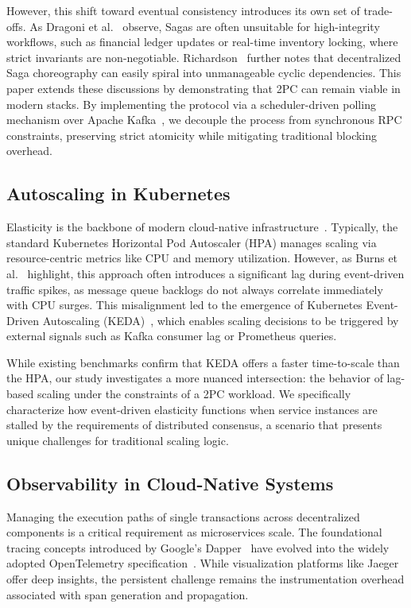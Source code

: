 However, this shift toward eventual consistency introduces its own set of trade-offs. As Dragoni et al.~\cite{dragoni2017microservices} observe, Sagas are often unsuitable for high-integrity workflows, such as financial ledger updates or real-time inventory locking, where strict invariants are non-negotiable. Richardson~\cite{richardson2018microservices} further notes that decentralized Saga choreography can easily spiral into unmanageable cyclic dependencies. This paper extends these discussions by demonstrating that 2PC can remain viable in modern stacks. By implementing the protocol via a scheduler-driven polling mechanism over Apache Kafka~\cite{kafka2011}, we decouple the process from synchronous RPC constraints, preserving strict atomicity while mitigating traditional blocking overhead.

\subsection{Autoscaling in Kubernetes}
\label{subsec:rw-autoscaling}
Elasticity is the backbone of modern cloud-native infrastructure~\cite{verma2015large}. Typically, the standard Kubernetes Horizontal Pod Autoscaler (HPA) manages scaling via resource-centric metrics like CPU and memory utilization. However, as Burns et al.~\cite{burns2022kubernetes} highlight, this approach often introduces a significant lag during event-driven traffic spikes, as message queue backlogs do not always correlate immediately with CPU surges. This misalignment led to the emergence of Kubernetes Event-Driven Autoscaling (KEDA)~\cite{kedadocs}, which enables scaling decisions to be triggered by external signals such as Kafka consumer lag or Prometheus queries. 

While existing benchmarks confirm that KEDA offers a faster time-to-scale than the HPA, our study investigates a more nuanced intersection: the behavior of lag-based scaling under the constraints of a 2PC workload. We specifically characterize how event-driven elasticity functions when service instances are stalled by the requirements of distributed consensus, a scenario that presents unique challenges for traditional scaling logic.

\subsection{Observability in Cloud-Native Systems}
\label{subsec:rw-observability}
Managing the execution paths of single transactions across decentralized components is a critical requirement as microservices scale. The foundational tracing concepts introduced by Google’s Dapper~\cite{dapper2010} have evolved into the widely adopted OpenTelemetry specification~\cite{opentelemetry2024}. While visualization platforms like Jaeger~\cite{jaeger2019} offer deep insights, the persistent challenge remains the instrumentation overhead associated with span generation and propagation. 


